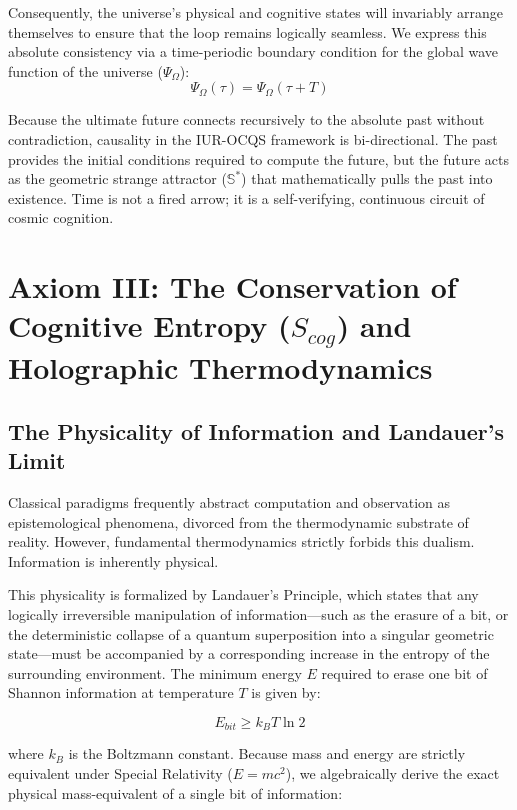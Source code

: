 \documentclass[12pt,openany]{book}
\begin{document}
Consequently, the universe's physical and cognitive states will invariably arrange themselves to ensure that the loop remains logically seamless. We express this absolute consistency via a time-periodic boundary condition for the global wave function of the universe ($\Psi_{\Omega}$):
\begin{equation}
    \Psi_{\Omega}(\tau) = \Psi_{\Omega}(\tau + T)
\end{equation}

Because the ultimate future connects recursively to the absolute past without contradiction, causality in the IUR-OCQS framework is bi-directional. The past provides the initial conditions required to compute the future, but the future acts as the geometric strange attractor ($\mathbb{S}^*$) that mathematically pulls the past into existence. Time is not a fired arrow; it is a self-verifying, continuous circuit of cosmic cognition.

\section[Axiom III]{Axiom III: The Conservation of Cognitive Entropy ($S_{cog}$) and Holographic Thermodynamics}

\subsection{The Physicality of Information and Landauer's Limit}
Classical paradigms frequently abstract computation and observation as epistemological phenomena, divorced from the thermodynamic substrate of reality. However, fundamental thermodynamics strictly forbids this dualism. Information is inherently physical. 

This physicality is formalized by Landauer's Principle, which states that any logically irreversible manipulation of information---such as the erasure of a bit, or the deterministic collapse of a quantum superposition into a singular geometric state---must be accompanied by a corresponding increase in the entropy of the surrounding environment. The minimum energy $E$ required to erase one bit of Shannon information at temperature $T$ is given by:

\begin{equation}
E_{bit} \ge k_B T \ln 2
\end{equation}

where $k_B$ is the Boltzmann constant. Because mass and energy are strictly equivalent under Special Relativity ($E = mc^2$), we algebraically derive the exact physical mass-equivalent of a single bit of information:
\end{document}
